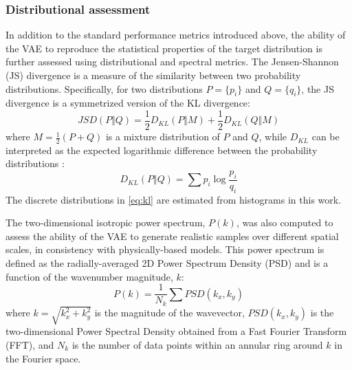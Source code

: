 \subsubsection{Distributional assessment}
In addition to the standard performance metrics introduced above, the ability of the VAE to reproduce the statistical properties of the target distribution is further assessed using distributional and spectral metrics. The Jensen-Shannon (JS) divergence is a measure of the similarity between two probability distributions. Specifically, for two distributions $P = \{p_i\}$ and $Q=\{q_i\}$, the JS divergence is a symmetrized version of the KL divergence:
\begin{equation}
  JSD(P \Vert Q) = \dfrac{1}{2} D_{KL}(P \Vert M) + \dfrac{1}{2} D_{KL}(Q \Vert M)
  \label{eq:js}
\end{equation}
where $M=\frac{1}{2}(P+Q)$ is a mixture distribution of $P$ and $Q$, while $D_{KL}$ can be interpreted as the expected logarithmic difference between the probability distributions \citep{goodfellow2016}:
\begin{equation}
  D_{KL}(P \Vert Q) = \sum p_i \log \dfrac{p_i}{q_i}
  \label{eq:kl}
\end{equation}
The discrete distributions in \eqref{eq:kl} are estimated from histograms in this work.

The two-dimensional isotropic power spectrum, $P(k)$, was also computed to assess the ability of the VAE to generate realistic samples over different spatial scales, in consistency with physically-based models. This power spectrum is defined as the radially-averaged 2D Power Spectrum Density (PSD) and is a function of the wavenumber magnitude, $k$:
\begin{equation}
  P(k) = \dfrac{1}{N_k} \sum PSD(k_x,k_y)
  \label{eq:psd}
\end{equation}
where $k=\sqrt{k_x^2 + k_y^2}$ is the magnitude of the wavevector, $PSD(k_x,k_y)$ is the two-dimensional Power Spectral Density obtained from a Fast Fourier Transform (FFT), and $N_k$ is the number of data points within an annular ring around $k$ in the Fourier space.

